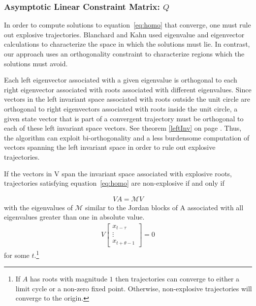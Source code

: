 \documentclass{elsart}
\begin{document}
\subsubsection{Asymptotic Linear Constraint Matrix: $Q$}
\label{asymQ}

\label{sec:invariantSpace}
In order to compute solutions to equation~\ref{eq:homo} that converge, 
one must rule out explosive trajectories. Blanchard and Kahn\cite{blanchard80} 
used eigenvalue and eigenvector calculations to characterize the space in 
which the solutions must lie. In contrast, our approach uses
an orthogonality constraint to characterize regions which the solutions 
must avoid.



Each left  eigenvector associated with a given eigenvalue
is orthogonal to each right eigenvector associated 
with roots associated with  different eigenvalues.
Since vectors in the left invariant space
associated with roots outside the unit circle are orthogonal to right eigenvectors associated with roots 
inside the
unit circle, a given state vector that is part of a convergent trajectory
must be orthogonal to each of these left invariant space vectors. See theorem
\ref{leftInv} on page \pageref{leftInv}.
Thus, the algorithm can exploit bi-orthogonality and a
less burdensome computation of vectors spanning the 
left invariant space  in order to rule out explosive
trajectories. 



If the vectors in V span the invariant space associated with explosive
roots,  trajectories satisfying equation~\ref{eq:homo} 
are non-explosive if and only if

\begin{gather}
 V A =   \mathcal{M}  V 
\end{gather}
with the eigenvalues of $ \mathcal{M}$ similar to the 
Jordan blocks of A associated with all eigenvalues
greater than one in absolute value.
\begin{gather}
V 
\begin{bmatrix}
  x_{t-\tau}\\
\vdots\\
  x_{t+\theta-1}
\end{bmatrix}=0
\end{gather}
for some $t$.\footnote{
If $A$ has roots with magnitude $1$ then trajectories can converge to 
either a limit cycle or a non-zero fixed point. Otherwise,
non-explosive trajectories will converge to the origin.}
\end{document}
